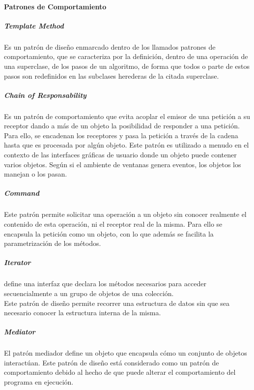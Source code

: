 \paragraph{Patrones de Comportamiento}
\subparagraph{Template Method}
Es un patrón de diseño enmarcado dentro de los llamados patrones de comportamiento, que se caracteriza por la definición, dentro de una operación de una superclase, de los pasos de un algoritmo, de forma que todos o parte de estos pasos son redefinidos en las subclases herederas de la citada superclase.\\
\vspace*{\fill}
\noindent{}
\subparagraph{Chain of Responsability}
Es un patrón de comportamiento que evita acoplar el emisor de una petición a su receptor dando a más de un objeto la posibilidad de responder a una petición. Para ello, se encadenan los receptores y pasa la petición a través de la cadena hasta que es procesada por algún objeto. Este patrón es utilizado a menudo en el contexto de las interfaces gráficas de usuario donde un objeto puede contener varios objetos. Según si el ambiente de ventanas genera eventos, los objetos los manejan o los pasan.\\
\vspace*{\fill}
\noindent{}
\subparagraph{Command}
Este patrón permite solicitar una operación a un objeto sin conocer realmente el contenido de esta operación, ni el receptor real de la misma. Para ello se encapsula la petición como un objeto, con lo que además se facilita la parametrización de los métodos.\\
\vspace*{\fill}
\noindent{}
\subparagraph{Iterator}
define una interfaz que declara los métodos necesarios para acceder secuencialmente a un grupo de objetos de una colección.\\
Este patrón de diseño permite recorrer una estructura de datos sin que sea necesario conocer la estructura interna de la misma.\\
\vspace*{\fill}
\noindent{}
\subparagraph{Mediator}
El patrón mediador define un objeto que encapsula cómo un conjunto de objetos interactúan. Este patrón de diseño está considerado como un patrón de comportamiento debido al hecho de que puede alterar el comportamiento del programa en ejecución.\\
